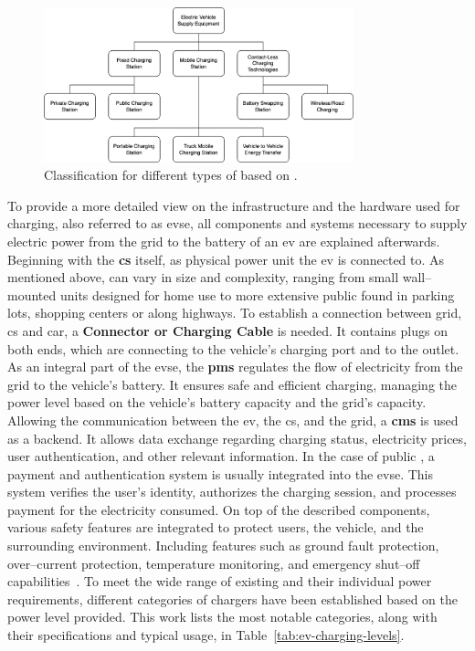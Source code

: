 \begin{figure}[h]
\centering
\includegraphics[width=0.8\textwidth]{resources/images/main/1_fundamentals/ChargingStationClassification.png}
\caption{Classification for different types of  based on \cite{afshar_literature_2020}.}
\label{fig:charging-station-classification}
\end{figure}

\noindent To provide a more detailed view on the infrastructure and the hardware used for charging, also referred to as \acrfull{evse}, all components and systems necessary to supply electric power from the grid to the battery of an \acrfull{ev} are explained afterwards.
Beginning with the \textbf{\acrfull{cs}} itself, as physical power unit the \acrshort{ev} is connected to. As mentioned above,  can vary in size and complexity, ranging from small wall--mounted units designed for home use to more extensive public  found in parking lots, shopping centers or along highways. 
To establish a connection between grid, \acrshort{cs} and car, a \textbf{Connector or Charging Cable} is needed. It contains plugs on both ends, which are connecting to the vehicle's charging port and to the  outlet. 
As an integral part of the \acrshort{evse}, the \textbf{\acrshort{pms}} regulates the flow of electricity from the grid to the vehicle's battery. It ensures safe and efficient charging, managing the power level based on the vehicle's battery capacity and the grid's capacity.
Allowing the communication between the \acrshort{ev}, the \acrfull{cs}, and the grid, a \textbf{\acrshort{cms}} is used as a backend. It allows data exchange regarding charging status, electricity prices, user authentication, and other relevant information.
In the case of public , a payment and authentication system is usually integrated into the \acrshort{evse}. This system verifies the user's identity, authorizes the charging session, and processes payment for the electricity consumed.
On top of the described components, various safety features are integrated to protect users, the vehicle, and the surrounding environment. Including features such as ground fault protection, over--current protection, temperature monitoring, and emergency shut--off capabilities~\cite{littlefuse_designing_2020}.
\noindent To meet the wide range of existing  and their individual power requirements, different categories of chargers have been established based on the power level provided. This work lists the most notable categories, along with their specifications and typical usage, in Table~\ref{tab:ev-charging-levels}. 

